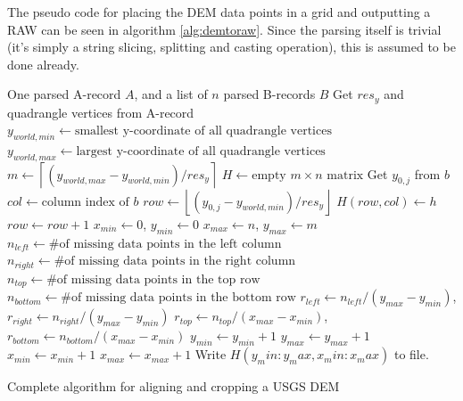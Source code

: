 The pseudo code for placing the DEM data points in a grid and outputting a RAW can be seen in algorithm \ref{alg:demtoraw}. Since the parsing itself is trivial (it's simply a string slicing, splitting and casting operation), this is assumed to be done already.

\begin{algorithm}[ht]
\begin{algorithmic}
\REQUIRE One parsed A-record $A$, and a list of $n$ parsed B-records $B$
\STATE Get $res_y$ and quadrangle vertices from A-record
\STATE $y_{world,min}\gets \mbox{smallest y-coordinate of all quadrangle vertices}$
\STATE $y_{world,max}\gets \mbox{largest y-coordinate of all quadrangle vertices}$
\STATE $m \gets \left\lceil(y_{world,max}-y_{world,min})/res_y\right\rceil$
\STATE $H\gets \mbox{empty $m\times n$ matrix}$
    \STATE Get $y_{0,j}$ from $b$
    \STATE $col \gets \mbox{column index of $b$}$
    \STATE $row \gets \left\lfloor (y_{0,j}-y_{world,min})/res_y\right\rfloor$
        \STATE $H(row,col) \gets h$
        \STATE $row \gets row+1$
    \ENDFOR
\ENDFOR
\STATE $x_{min}\gets 0$, $y_{min}\gets 0$
\STATE $x_{max}\gets n$, $y_{max}\gets m$
    \STATE $n_{left}\gets \mbox{\# of missing data points in the left column}$
    \STATE $n_{right}\gets \mbox{\# of missing data points in the right column}$
    \STATE $n_{top}\gets \mbox{\# of missing data points in the top row}$
    \STATE $n_{bottom}\gets \mbox{\# of missing data points in the bottom row}$
    \STATE $r_{left}\gets n_{left}/(y_{max}-y_{min})$, $r_{right}\gets n_{right}/(y_{max}-y_{min})$
    \STATE $r_{top}\gets n_{top}/(x_{max}-x_{min})$, $r_{bottom}\gets n_{bottom}/(x_{max}-x_{min})$
        \STATE $y_{min} \gets y_{min}+1$
        \STATE $y_{max} \gets y_{max}+1$
        \STATE $x_{min} \gets x_{min}+1$
        \STATE $x_{max} \gets x_{max}+1$
    \ENDIF
\ENDWHILE
\STATE Write $H(y_min:y_max, x_min:x_max)$ to file.
\end{algorithmic}
\caption{Complete algorithm for aligning and cropping a USGS DEM}
\label{alg:demtoraw}
\end{algorithm}

